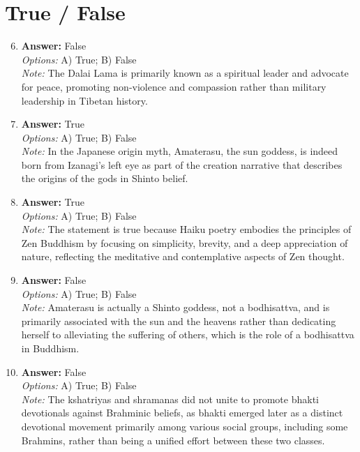 \documentclass[12pt]{article}
\begin{document}
\section*{True / False}
\begin{enumerate}[label=\arabic*.]
\setcounter{enumi}{5}
\item \textbf{Answer:} False
\\ \textit{Options:} A) True; B) False
\\ \textit{Note:} The Dalai Lama is primarily known as a spiritual leader and advocate for peace, promoting non-violence and compassion rather than military leadership in Tibetan history.
\item \textbf{Answer:} True
\\ \textit{Options:} A) True; B) False
\\ \textit{Note:} In the Japanese origin myth, Amaterasu, the sun goddess, is indeed born from Izanagi's left eye as part of the creation narrative that describes the origins of the gods in Shinto belief.
\item \textbf{Answer:} True
\\ \textit{Options:} A) True; B) False
\\ \textit{Note:} The statement is true because Haiku poetry embodies the principles of Zen Buddhism by focusing on simplicity, brevity, and a deep appreciation of nature, reflecting the meditative and contemplative aspects of Zen thought.
\item \textbf{Answer:} False
\\ \textit{Options:} A) True; B) False
\\ \textit{Note:} Amaterasu is actually a Shinto goddess, not a bodhisattva, and is primarily associated with the sun and the heavens rather than dedicating herself to alleviating the suffering of others, which is the role of a bodhisattva in Buddhism.
\item \textbf{Answer:} False
\\ \textit{Options:} A) True; B) False
\\ \textit{Note:} The kshatriyas and shramanas did not unite to promote bhakti devotionals against Brahminic beliefs, as bhakti emerged later as a distinct devotional movement primarily among various social groups, including some Brahmins, rather than being a unified effort between these two classes.
\end{enumerate}
\end{document}
